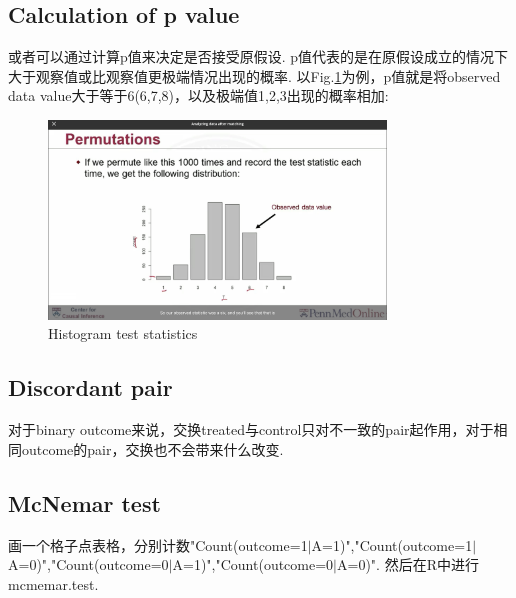 \subsection{Calculation of p value}
或者可以通过计算p值来决定是否接受原假设. p值代表的是在原假设成立的情况下大于观察值或比观察值更极端情况出现的概率. 以Fig.\ref{histts}为例，p值就是将observed data value大于等于6(6,7,8)，以及极端值1,2,3出现的概率相加:
\begin{figure}[htbp]
	\setlength{\abovecaptionskip}{0pt}     %
	\setlength{\belowcaptionskip}{10pt}
	\vspace{-0cm}  %
	\setlength{\abovecaptionskip}{-0cm}   %
	\setlength{\belowcaptionskip}{-0cm}   %
	\centering
	\includegraphics[width=0.8\textwidth]{figure/histts.jpg}
	\caption{Histogram test statistics}
	\label{histts}
\end{figure}

\subsection{Discordant pair}
对于binary outcome来说，交换treated与control只对不一致的pair起作用，对于相同outcome的pair，交换也不会带来什么改变. 

\subsection{McNemar test}
画一个格子点表格，分别计数"Count(outcome=1$|$A=1)","Count(outcome=1$|$A=0)","Count(outcome=0$|$A=1)","Count(outcome=0$|$A=0)". 然后在R中进行mcmemar.test.

